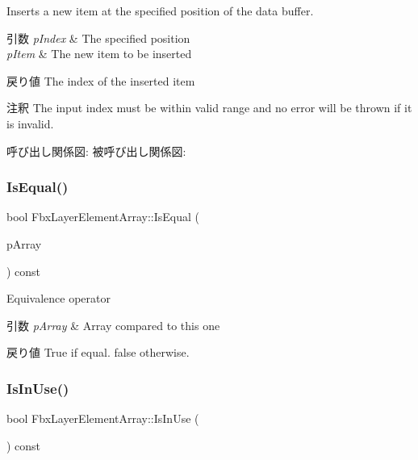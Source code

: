 Inserts a new item at the specified position of the data buffer. 
\begin{DoxyParams}{引数}
{\em p\+Index} & The specified position \\
\hline
{\em p\+Item} & The new item to be inserted \\
\hline
\end{DoxyParams}
\begin{DoxyReturn}{戻り値}
The index of the inserted item 
\end{DoxyReturn}
\begin{DoxyRemark}{注釈}
The input index must be within valid range and no error will be thrown if it is invalid. 
\end{DoxyRemark}
呼び出し関係図\+:
被呼び出し関係図\+:
\mbox{\label{class_fbx_layer_element_array_a3e34cd89f4c2becbf6d114ac08de40ce}} 
\subsubsection{\texorpdfstring{Is\+Equal()}{IsEqual()}}
{\footnotesize\ttfamily bool Fbx\+Layer\+Element\+Array\+::\+Is\+Equal (\begin{DoxyParamCaption}\item[{const \hyperlink{class_fbx_layer_element_array}{Fbx\+Layer\+Element\+Array} \&}]{p\+Array }\end{DoxyParamCaption}) const}

Equivalence operator 
\begin{DoxyParams}{引数}
{\em p\+Array} & Array compared to this one \\
\hline
\end{DoxyParams}
\begin{DoxyReturn}{戻り値}
{\ttfamily True} if equal. {\ttfamily false} otherwise. 
\end{DoxyReturn}
\mbox{\label{class_fbx_layer_element_array_a83e174dd9818d314a274bd87f7b9aa38}} 
\subsubsection{\texorpdfstring{Is\+In\+Use()}{IsInUse()}}
{\footnotesize\ttfamily bool Fbx\+Layer\+Element\+Array\+::\+Is\+In\+Use (\begin{DoxyParamCaption}{ }\end{DoxyParamCaption}) const}

